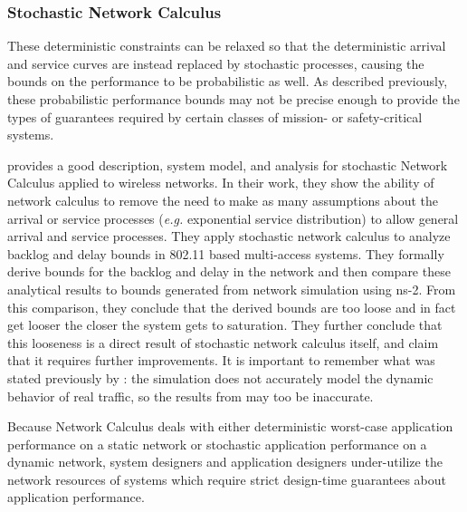 \subsubsection{Stochastic Network Calculus}
These deterministic constraints can be relaxed so that the
deterministic arrival and service curves are instead replaced by
stochastic processes, causing the bounds on the performance to be
probabilistic as well\cite{Burchard06amin-plus}.  As described
previously, these probabilistic performance bounds may not be precise
enough to provide the types of guarantees required by certain classes
of mission- or safety-critical systems.

\cite{SNC80211backlogdelay2011} provides a good description, system
model, and analysis for stochastic Network Calculus applied to
wireless networks.  In their work, they show the ability of network
calculus to remove the need to make as many assumptions about the
arrival or service processes (\emph{e.g.} exponential service
distribution) to allow general arrival and service processes.  They
apply stochastic network calculus to analyze backlog and delay bounds
in 802.11 based multi-access systems.  They formally derive bounds for
the backlog and delay in the network and then compare these analytical
results to bounds generated from network simulation using ns-2.  From
this comparison, they conclude that the derived bounds are too loose
and in fact get looser the closer the system gets to saturation.  They
further conclude that this looseness is a direct result of stochastic
network calculus itself, and claim that it requires further
improvements.  It is important to remember what was stated previously
by \cite{simulator_comparison_2003}: the simulation does not
accurately model the dynamic behavior of real traffic, so the results
from \cite{SNC80211backlogdelay2011} may too be inaccurate.

Because Network Calculus deals with either deterministic worst-case
application performance on a static network or stochastic application
performance on a dynamic network, system designers and application
designers under-utilize the network resources of systems which require
strict design-time guarantees about application performance.


